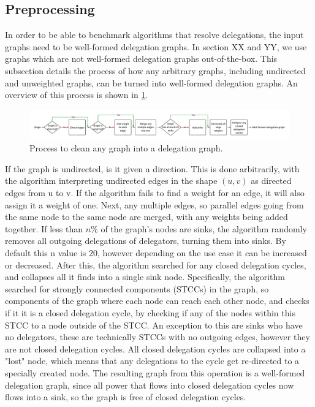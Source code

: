 \subsection{Preprocessing}

In order to be able to benchmark algorithms that resolve delegations, the input graphs need to be well-formed delegation graphs. In section XX and YY, we use graphs which are not well-formed delegation graphs out-of-the-box. This subsection details the process of how any arbitrary graphs, including undirected and unweighted graphs, can be turned into well-formed delegation graphs. An overview of this process is shown in \cref{fig:cleaning_process}.

\begin{figure}[h]
    \centering
    \includegraphics[width=\textwidth]{Thesis Evaluation Methodology Process.png}
    \caption{Process to clean any graph into a delegation graph.}
    \label{fig:cleaning_process}
\end{figure}

If the graph is undirected, is it given a direction. This is done arbitrarily, with the algorithm interpreting undirected edges in the shape $(u, v)$ as directed edges from u to v. If the algorithm fails to find a weight for an edge, it will also assign it a weight of one. Next, any multiple edges, so parallel edges going from the same node to the same node are merged, with any weights being added together. If less than $n\%$ of the graph's nodes are sinks, the algorithm randomly removes all outgoing delegations of delegators, turning them into sinks. By default this n value is 20, however depending on the use case it can be increased or decreased. After this, the algorithm searched for any closed delegation cycles, and collapses all it finds into a single sink node. Specifically, the algorithm searched for strongly connected components (STCCs) in the graph, so components of the graph where each node can reach each other node, and checks if it it is a closed delegation cycle, by checking if any of the nodes within this STCC to a node outside of the STCC. An exception to this are sinks who have no delegators, these are technically STCCs with no outgoing edges, however they are not closed delegation cycles. All closed delegation cycles are collapsed into a "lost" node, which means that any delegations to the cycle get re-directed to a specially created node. The resulting graph from this operation is a well-formed delegation graph, since all power that flows into closed delegation cycles now flows into a sink, so the graph is free of closed delegation cycles.

